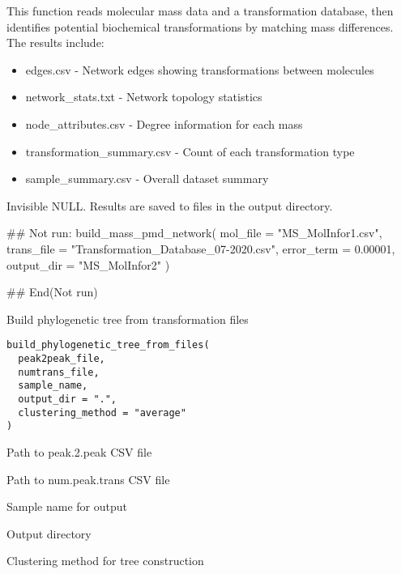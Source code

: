 \documentclass[a4paper]{book}
\begin{document}
\begin{Details}
This function reads molecular mass data and a transformation database, then identifies
potential biochemical transformations by matching mass differences. The results include:
\begin{itemize}

\item{} edges.csv - Network edges showing transformations between molecules
\item{} network\_stats.txt - Network topology statistics
\item{} node\_attributes.csv - Degree information for each mass
\item{} transformation\_summary.csv - Count of each transformation type
\item{} sample\_summary.csv - Overall dataset summary

\end{itemize}

\end{Details}
%
\begin{Value}
Invisible NULL. Results are saved to files in the output directory.
\end{Value}
%
\begin{Examples}
\begin{ExampleCode}
## Not run: 
build_mass_pmd_network(
    mol_file = "MS_MolInfor1.csv",
    trans_file = "Transformation_Database_07-2020.csv",
    error_term = 0.00001,
    output_dir = "MS_MolInfor2"
)

## End(Not run)

\end{ExampleCode}
\end{Examples}
%
\begin{Description}
Build phylogenetic tree from transformation files
\end{Description}
%
\begin{Usage}
\begin{verbatim}
build_phylogenetic_tree_from_files(
  peak2peak_file,
  numtrans_file,
  sample_name,
  output_dir = ".",
  clustering_method = "average"
)
\end{verbatim}
\end{Usage}
%
\begin{Arguments}
\begin{ldescription}
\item[\code{peak2peak\_file}] Path to peak.2.peak CSV file

\item[\code{numtrans\_file}] Path to num.peak.trans CSV file

\item[\code{sample\_name}] Sample name for output

\item[\code{output\_dir}] Output directory

\item[\code{clustering\_method}] Clustering method for tree construction
\end{ldescription}
\end{Arguments}
\end{document}
